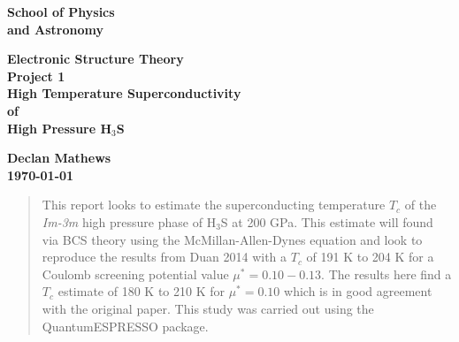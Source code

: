 \documentclass[a4paper,12pt]{article}
\begin{document}
\pagestyle{empty}                       %
\begin{minipage}[b]{110mm}
        {\Huge\bf School of Physics\\ and Astronomy
        \vspace*{17mm}}
\end{minipage}
\hfill
\begin{minipage}[t]{40mm}               
\end{minipage}
\par\noindent                                           %
\vspace*{1cm}
\begin{center}
        \Large\bf \Large\bf Electronic Structure Theory\\
        \Large\bf Project 1\\[10pt]                     %
        \vspace*{0.3cm}
        \LARGE\bf High Temperature Superconductivity\\        %
        \large \bf of\\
        \large \bf High Pressure H$_3$S
\end{center}
\vspace*{0.3cm}
\begin{center}
        \bf Declan Mathews\\                           %
        \today                             %
\end{center}
\vspace*{3mm}
%
%                       
\begin{abstract}
       \noindent This report looks to estimate the superconducting temperature $T_c$ of the \textit{Im-3m} high pressure phase of H$_3$S at 200 GPa. This estimate will found via BCS theory using the McMillan-Allen-Dynes equation and look to reproduce the results from Duan 2014 with a $T_c$ of 191 K to 204 K for a Coulomb screening potential value $\mu^*=0.10-0.13$. The results here find a $T_c$ estimate of 180 K to 210 K for $\mu^*=0.10$ which is in good agreement with the original paper. This study was carried out using the QuantumESPRESSO package.
        
\end{abstract}
\end{document}

